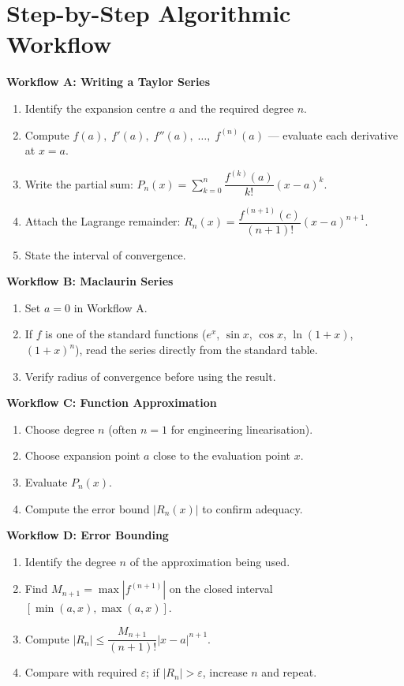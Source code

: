 \documentclass[12pt,a4paper]{article}
\begin{document}
\section{Step-by-Step Algorithmic Workflow}

\begin{tcolorbox}[colback=gray!5, colframe=gray!50, title=\textbf{Master Workflow for Series Expansions}, breakable]

\textbf{Workflow A: Writing a Taylor Series}
\begin{enumerate}[leftmargin=2em]
  \item Identify the expansion centre \(a\) and the required degree \(n\).
  \item Compute \(f(a),\; f'(a),\; f''(a),\; \ldots,\; f^{(n)}(a)\) --- evaluate each derivative at \(x = a\).
  \item Write the partial sum: \(P_n(x) = \sum_{k=0}^{n}\dfrac{f^{(k)}(a)}{k!}(x-a)^k\).
  \item Attach the Lagrange remainder: \(R_n(x) = \dfrac{f^{(n+1)}(c)}{(n+1)!}(x-a)^{n+1}\).
  \item State the interval of convergence.
\end{enumerate}

\medskip
\textbf{Workflow B: Maclaurin Series}
\begin{enumerate}[leftmargin=2em]
  \item Set \(a = 0\) in Workflow A.
  \item If \(f\) is one of the standard functions (\(e^x\), \(\sin x\), \(\cos x\), \(\ln(1+x)\), \((1+x)^n\)),
        read the series directly from the standard table.
  \item Verify radius of convergence before using the result.
\end{enumerate}

\medskip
\textbf{Workflow C: Function Approximation}
\begin{enumerate}[leftmargin=2em]
  \item Choose degree \(n\) (often \(n=1\) for engineering linearisation).
  \item Choose expansion point \(a\) close to the evaluation point \(x\).
  \item Evaluate \(P_n(x)\).
  \item Compute the error bound \(|R_n(x)|\) to confirm adequacy.
\end{enumerate}

\medskip
\textbf{Workflow D: Error Bounding}
\begin{enumerate}[leftmargin=2em]
  \item Identify the degree \(n\) of the approximation being used.
  \item Find \(M_{n+1} = \max |f^{(n+1)}|\) on the closed interval \([\min(a,x),\max(a,x)]\).
  \item Compute \(|R_n| \leq \dfrac{M_{n+1}}{(n+1)!}|x-a|^{n+1}\).
  \item Compare with required \(\varepsilon\); if \(|R_n| > \varepsilon\), increase \(n\) and repeat.
\end{enumerate}
\end{tcolorbox}
\end{document}
